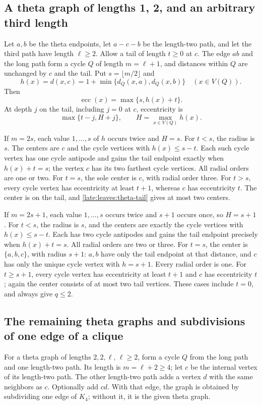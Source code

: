 \documentclass[11pt,a4paper]{article}
\theoremstyle{definition}\newtheorem{definition}[theorem]{Definition}
\theoremstyle{remark}\newtheorem{remark}[theorem]{Remark}
\begin{document}
\subsection{A theta graph of lengths 1, 2, and an arbitrary third length}
Let $a,b$ be the theta endpoints, let $a-c-b$ be the length-two path,
and let the third path have length $\ell\ge2$. Allow a tail of length
$t\ge0$ at $c$. The edge $ab$ and the long path form a cycle $Q$ of
length $m=\ell+1$, and distances within $Q$ are unchanged by $c$ and
the tail. Put $s=\lfloor m/2\rfloor$ and
\[
 h(x)=d(x,c)=1+\min\{d_Q(x,a),d_Q(x,b)\}\quad(x\in V(Q)).
\]
Then
\begin{equation}\label{late:leaves:theta-cycle}
 \operatorname{ecc}(x)=\max\{s,h(x)+t\}.
\end{equation}
At depth $j$ on the tail, including $j=0$ at $c$, eccentricity is
\begin{equation}\label{late:leaves:theta-tail}
 \max\{t-j,H+j\},\qquad H=\max_{x\in V(Q)}h(x).
\end{equation}

If $m=2s$, each value $1,\ldots,s$ of $h$ occurs twice and $H=s$.
For $t<s$, the radius is $s$. The centers are $c$ and the cycle vertices
with $h(x)\le s-t$. Each such cycle vertex has one cycle antipode and
gains the tail endpoint exactly when $h(x)+t=s$; the vertex $c$ has its
two farthest cycle vertices. All radial orders are one or two.
For $t=s$, the sole center is $c$, with radial order three.
For $t>s$, every cycle vertex has eccentricity at least $t+1$, whereas
$c$ has eccentricity $t$. The center is on the tail, and
\eqref{late:leaves:theta-tail} gives at most two centers.

If $m=2s+1$, each value $1,\ldots,s$ occurs twice and $s+1$ occurs once,
so $H=s+1$. For $t<s$, the radius is $s$, and the centers are exactly
the cycle vertices with $h(x)\le s-t$. Each has two cycle antipodes and
gains the tail endpoint precisely when $h(x)+t=s$. All radial orders
are two or three. For $t=s$, the center is $\{a,b,c\}$, with radius
$s+1$: $a,b$ have only the tail endpoint at that distance, and $c$ has
only the unique cycle vertex with $h=s+1$. Every radial order is one.
For $t\ge s+1$, every cycle vertex has eccentricity at least $t+1$ and
$c$ has eccentricity $t$; again the center consists of at most two tail
vertices. These cases include $t=0$, and always give $q\le2$.

\subsection{The remaining theta graphs and subdivisions of one edge of a clique}
For a theta graph of lengths $2,2,\ell$, $\ell\ge2$, form a cycle $Q$
from the long path and one length-two path. Its length is $m=\ell+2\ge4$;
let $c$ be the internal vertex of its length-two path. The other
length-two path adds a vertex $d$ with the same neighbors as $c$.
Optionally add $cd$. With that edge, the graph is obtained by subdividing
one edge of $K_4$; without it, it is the given theta graph.
\end{document}
